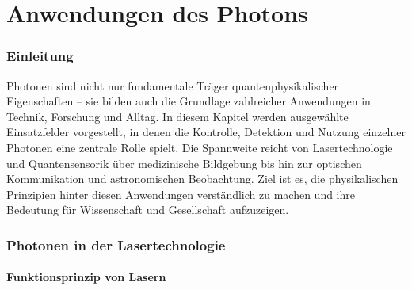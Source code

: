 \chapter{Anwendungen des Photons}

\setcounter{section}{6}
\setcounter{subsection}{0}
\setcounter{subsubsection}{1}
\setcounter{secnumdepth}{3}

\subsection{Einleitung}

Photonen sind nicht nur fundamentale Träger quantenphysikalischer Eigenschaften – sie bilden auch die Grundlage zahlreicher Anwendungen in Technik, Forschung und Alltag. In diesem Kapitel werden ausgewählte Einsatzfelder vorgestellt, in denen die Kontrolle, Detektion und Nutzung einzelner Photonen eine zentrale Rolle spielt. Die Spannweite reicht von Lasertechnologie und Quantensensorik über medizinische Bildgebung bis hin zur optischen Kommunikation und astronomischen Beobachtung. Ziel ist es, die physikalischen Prinzipien hinter diesen Anwendungen verständlich zu machen und ihre Bedeutung für Wissenschaft und Gesellschaft aufzuzeigen.

\subsection{Photonen in der Lasertechnologie}
\subsubsection{Funktionsprinzip von Lasern}

